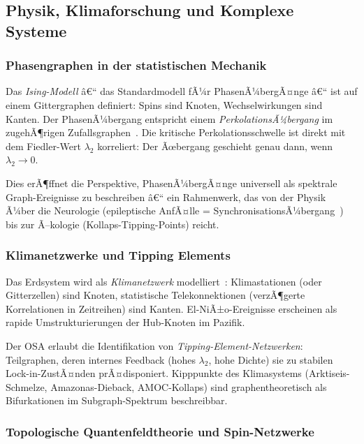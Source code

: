 ﻿\documentclass[12pt,a4paper,twoside]{article}
\theoremstyle{definition}
\theoremstyle{plain}
\theoremstyle{remark}
\begin{document}
\subsection{Physik, Klimaforschung und Komplexe Systeme}
\label{sub:physik}

\subsubsection{Phasengraphen in der statistischen Mechanik}

Das \emph{Ising-Modell} â€“ das Standardmodell fÃ¼r
PhasenÃ¼bergÃ¤nge â€“ ist auf einem Gittergraphen definiert:
Spins sind Knoten, Wechselwirkungen sind Kanten.
Der PhasenÃ¼bergang entspricht einem \emph{PerkolationsÃ¼bergang}
im zugehÃ¶rigen Zufallsgraphen~\cite{Erdos1960}.  Die
kritische Perkolationsschwelle ist direkt mit dem
Fiedler-Wert $\lambda_2$ korreliert: Der Ãœbergang
geschieht genau dann, wenn $\lambda_2 \to 0$.

Dies erÃ¶ffnet die Perspektive, PhasenÃ¼bergÃ¤nge universell
als spektrale Graph-Ereignisse zu beschreiben â€“ ein Rahmenwerk,
das von der Physik Ã¼ber die Neurologie (epileptische
AnfÃ¤lle = SynchronisationsÃ¼bergang~\cite{Strogatz2001})
bis zur Ã–kologie (Kollaps-Tipping-Points) reicht.

\subsubsection{Klimanetzwerke und Tipping Elements}

Das Erdsystem wird als \emph{Klimanetzwerk} modelliert~\cite{Donges2009}:
Klimastationen (oder Gitterzellen) sind Knoten, statistische
Telekonnektionen (verzÃ¶gerte Korrelationen in Zeitreihen)
sind Kanten.  El-NiÃ±o-Ereignisse erscheinen als
rapide Umstrukturierungen der Hub-Knoten im Pazifik.

Der OSA erlaubt die Identifikation von \emph{Tipping-Element-Netzwerken}:
Teilgraphen, deren internes Feedback (hohes $\lambda_2$,
hohe Dichte) sie zu stabilen Lock-in-ZustÃ¤nden prÃ¤disponiert.
Kipppunkte des Klimasystems (Arktiseis-Schmelze,
Amazonas-Dieback, AMOC-Kollaps) sind graphentheoretisch
als Bifurkationen im Subgraph-Spektrum beschreibbar.

\subsubsection{Topologische Quantenfeldtheorie und Spin-Netzwerke}
\end{document}
